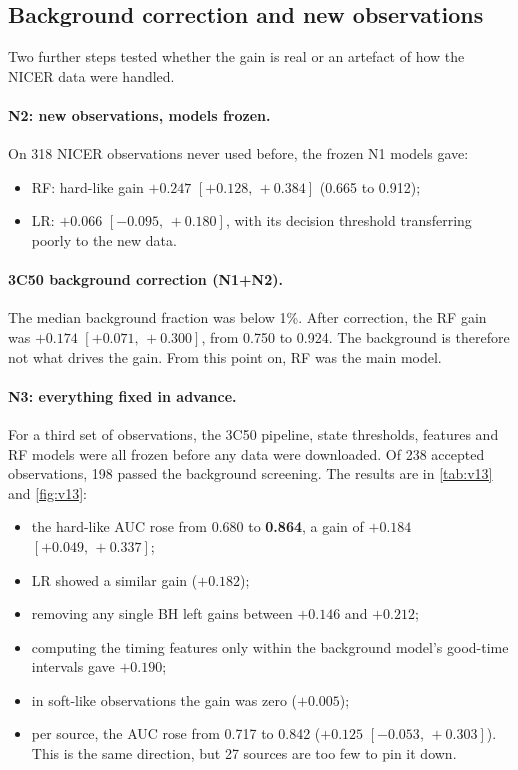\documentclass[11pt,a4paper]{article}
\newcommand{\ci}[2]{$[#1,\,#2]$}
\begin{document}
\subsection{Background correction and new observations}
Two further steps tested whether the gain is real or an artefact of how the NICER data were handled.

\paragraph{N2: new observations, models frozen.}
On 318 NICER observations never used before, the frozen N1 models gave:
\begin{itemize}[leftmargin=1.4em]
\item RF: hard-like gain $+0.247$ \ci{+0.128}{+0.384} (0.665 to 0.912);
\item LR: $+0.066$ \ci{-0.095}{+0.180}, with its decision threshold transferring poorly to the new data.
\end{itemize}

\paragraph{3C50 background correction (N1+N2).}
The median background fraction was below 1\%. After correction, the RF gain was $+0.174$ \ci{+0.071}{+0.300}, from
0.750 to 0.924. The background is therefore not what drives the gain. From this point on, RF was the main model.

\paragraph{N3: everything fixed in advance.}
For a third set of observations, the 3C50 pipeline, state thresholds, features and RF models were all frozen before any
data were downloaded. Of 238 accepted observations, 198 passed the background screening. The results are in
\cref{tab:v13} and \cref{fig:v13}:
\begin{itemize}[leftmargin=1.4em]
\item the hard-like AUC rose from 0.680 to \textbf{0.864}, a gain of \textbf{$+0.184$ \ci{+0.049}{+0.337}};
\item LR showed a similar gain ($+0.182$);
\item removing any single BH left gains between $+0.146$ and $+0.212$;
\item computing the timing features only within the background model's good-time intervals gave $+0.190$;
\item in soft-like observations the gain was zero ($+0.005$);
\item per source, the AUC rose from 0.717 to 0.842 ($+0.125$ \ci{-0.053}{+0.303}). This is the same direction, but
27 sources are too few to pin it down.
\end{itemize}
\end{document}
